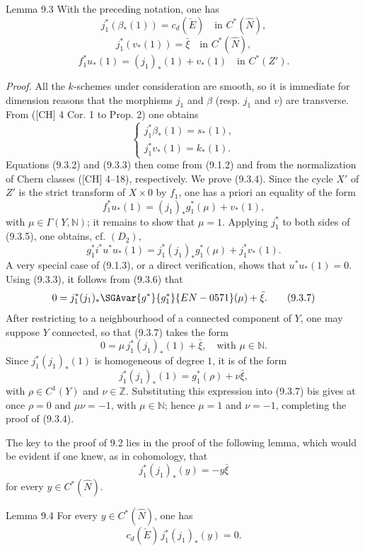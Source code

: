 \begin{statement}{Lemma 9.3}
With the preceding notation, one has
\[
j_1^*(\beta_*(1))=c_d(\check E)\quad\text{in }C^*(\widehat N),
\tag{9.3.2}
\]
\[
j_1^*(v_*(1))=\bar\xi\quad\text{in }C^*(\widehat N),
\tag{9.3.3}
\]
\[
f_1^*u_*(1)=(j_1)_*(1)+v_*(1)\quad\text{in }C^*(Z').
\tag{9.3.4}
\]
\end{statement}

\emph{Proof.} All the $k$-schemes under consideration are smooth, so it is immediate for dimension reasons that the morphisms $j_1$ and $\beta$ (resp. $j_1$ and $v$) are transverse. From ([CH] 4 Cor. 1 to Prop. 2) one obtains
\[
\begin{cases}
j_1^*\beta_*(1)=s_*(1),\\
j_1^*v_*(1)=k_*(1).
\end{cases}
\]
Equations (9.3.2) and (9.3.3) then come from (9.1.2) and from the normalization of Chern classes ([CH] 4--18), respectively. We prove (9.3.4). Since the cycle $X'$ of $Z'$ is the strict transform of $X\times0$ by $f_1$, one has a priori an equality of the form
\[
f_1^*u_*(1)=(j_1)_*g_1^*(\mu)+v_*(1),
\tag{9.3.5}
\]
with $\mu\in\Gamma(Y,\mathbb N)$; it remains to show that $\mu=1$. Applying $j_1^*$ to both sides of (9.3.5), one obtains, cf. $(D_2)$,
\[
g_1^*i^*u^*u_*(1)=j_1^*(j_1)_*g_1^*(\mu)+j_1^*v_*(1).
\tag{9.3.6}
\]
A very special case of (9.1.3), or a direct verification, shows that $u^*u_*(1)=0$. Using (9.3.3), it follows from (9.3.6) that
\[
0=j_1^*(j_1)_*\SGAvar{g^*}{g_1^*}{EN-0571}(\mu)+\bar\xi.
\tag{9.3.7}
\]
After restricting to a neighbourhood of a connected component of $Y$, one may suppose $Y$ connected, so that (9.3.7) takes the form
\[
0=\mu\,j_1^*(j_1)_*(1)+\bar\xi,\quad\text{with }\mu\in\mathbb N.
\tag{9.3.7 bis}
\]
Since $j_1^*(j_1)_*(1)$ is homogeneous of degree $1$, it is of the form
\[
j_1^*(j_1)_*(1)=g_1^*(\rho)+\nu\bar\xi,
\]
with $\rho\in C^1(Y)$ and $\nu\in\mathbb Z$. Substituting this expression into (9.3.7) bis gives at once $\rho=0$ and $\mu\nu=-1$, with $\mu\in\mathbb N$; hence $\mu=1$ and $\nu=-1$, completing the proof of (9.3.4).

The key to the proof of 9.2 lies in the proof of the following lemma, which would be evident if one knew, as in cohomology, that
\[
j_1^*(j_1)_*(y)=-y\bar\xi
\]
for every $y\in C^*(\widehat N)$.

\begin{statement}{Lemma 9.4}
For every $y\in C^*(\widehat N)$, one has
\[
c_d(\check E)\,j_1^*(j_1)_*(y)=0.
\]
\end{statement}

